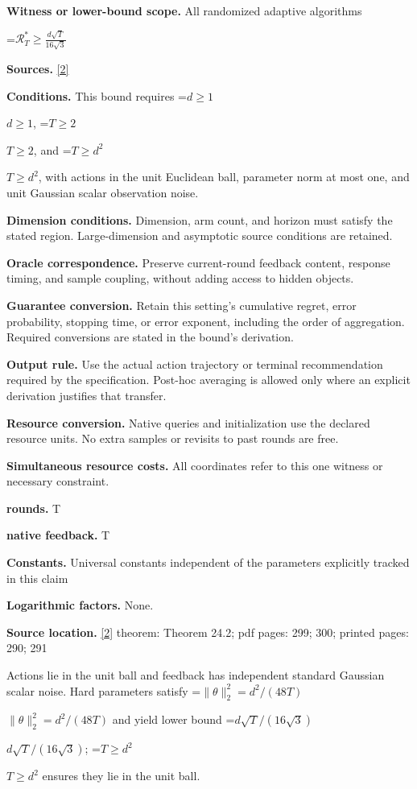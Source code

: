 \documentclass[10pt,a4paper]{article}
\newcommand{\AtlasMath}[1]{\par\begingroup\centering\setbox0=\hbox{$\displaystyle #1$}\ifdim\wd0>1.4\linewidth\typeout{ATLAS WIDE FORMULA: \the\wd0}\fi\ifdim\wd0>\linewidth\resizebox{\linewidth}{!}{\box0}\else\box0\fi\par\endgroup}
\newcommand{\AtlasInlineMath}[1]{\begingroup\setbox0=\hbox{$#1$}\ifdim\wd0>.4\linewidth\endgroup\AtlasMath{#1}\else\endgroup$#1$\fi}
\begin{document}
\textbf{Witness or lower-bound scope.} All randomized adaptive algorithms

\AtlasMath{\mathcal{R}_T^*\ge\frac{d\sqrt T}{16\sqrt3}}
\textbf{Sources.} \href{https://tor-lattimore.com/downloads/book/book.pdf}{[2]}

\textbf{Conditions.} This bound requires \AtlasInlineMath{d\ge1}, \AtlasInlineMath{T\ge2}, and \AtlasInlineMath{T\ge d^2}, with actions in the unit Euclidean ball, parameter norm at most one, and unit Gaussian scalar observation noise.

\textbf{Dimension conditions.} Dimension, arm count, and horizon must satisfy the stated region. Large-dimension and asymptotic source conditions are retained.

\textbf{Oracle correspondence.} Preserve current-round feedback content, response timing, and sample coupling, without adding access to hidden objects.

\textbf{Guarantee conversion.} Retain this setting's cumulative regret, error probability, stopping time, or error exponent, including the order of aggregation. Required conversions are stated in the bound's derivation.

\textbf{Output rule.} Use the actual action trajectory or terminal recommendation required by the specification. Post-hoc averaging is allowed only where an explicit derivation justifies that transfer.

\textbf{Resource conversion.} Native queries and initialization use the declared resource units. No extra samples or revisits to past rounds are free.

\textbf{Simultaneous resource costs.} All coordinates refer to this one witness or necessary constraint.

\textbf{rounds.} T

\textbf{native feedback.} T

\textbf{Constants.} Universal constants independent of the parameters explicitly tracked in this claim

\textbf{Logarithmic factors.} None.

\textbf{Source location.} \href{https://tor-lattimore.com/downloads/book/book.pdf}{[2]} theorem: Theorem 24.2; pdf pages: 299; 300; printed pages: 290; 291

Actions lie in the unit ball and feedback has independent standard Gaussian scalar noise. Hard parameters satisfy \AtlasInlineMath{\|\theta\|_2^2=d^2/(48T)} and yield lower bound \AtlasInlineMath{d\sqrt T/(16\sqrt3)}; \AtlasInlineMath{T\ge d^2} ensures they lie in the unit ball.
\end{document}
